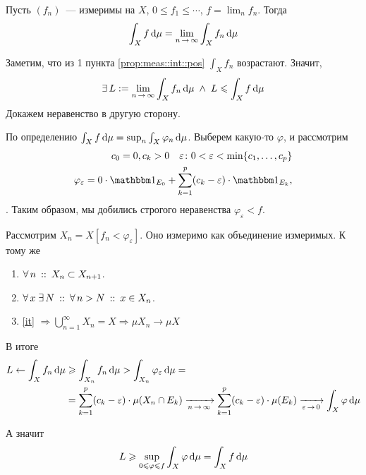 \documentclass[draft, timbord]{longnotes}
\begin{document}
\begin{thrm}\label{thrm:meas::levi}
  Пусть $(f_n)$~--- измеримы на $X$, $0 \leqslant f_1 \leqslant \cdots $, 
  $f = \lim_n f_n$. Тогда 
  \[
    \int_X f \, \del \mu  = \lim_{n\to \infty} \int_X f_n \, \del \mu 
  \]
\end{thrm}
\begin{tproof}
  Заметим, что из 1 пункта \ref{prop:meas::int::pos} $\int_X f_n$ возрастают.
  Значит, 
  \[
    \exists\, L := \lim_{n\to \infty } \int_X f_n \, \del \mu 
    \;\land\;
    L \leqslant \int_X f\, \del \mu 
  \]
  Докажем неравенство в другую сторону. 

  По определению
  $\int_X f \, \mathrm{d} \mu = \sup_n \int_X \varphi_n \, \mathrm{d} \mu$.
  Выберем какую-то $\varphi$, и рассмотрим 
  \[
    \begin{split}
      c_0 = 0, c_k > 0 \quad
      \varepsilon \colon 0 < \varepsilon < \min \{c_1, \dotsc, c_p\}\\
      \varphi_\varepsilon = 0\cdot\ind_{E_0} + \sum_{k=1}^p (c_k- \varepsilon) \cdot \ind_{E_k}, 
    \end{split}
  \]
  . Таким образом, мы добились строгого неравенства
  $\varphi_\varepsilon < f$.

  Рассмотрим $X_n = X [f_n < \varphi_\varepsilon ]$. Оно измеримо как объединение измеримых.
  К тому же 

  \begin{enumerate}
    \item $\forall\, n \:::\: X_n \subset X_{n+1}$. 
    \item\label{it} $\forall\, x \; \exists\, N \:::\: \forall\, n > N \:::\: x \in X_n$.
    \item \ref{it} $\Rightarrow \bigcup_{n=1}^\infty X_n = X \Rightarrow \mu X_n \to \mu X$
  \end{enumerate}

  В итоге
  \[
    \begin{split}
      L \gets \int_X f_n  \, \del \mu &\geqslant \int_{X_n} f_n \, \del \mu 
      > \int_{X_n} \varphi_\varepsilon \, \del \mu = \\
      &= \sum_{k=1}^p (c_k -\varepsilon) \cdot \mu(X_n \cap E_k)  
      \xto{n\to \infty} \sum_{k=1}^p (c_k -\varepsilon) \cdot \mu(E_k) 
      \xto{\varepsilon \to 0} \int_X \varphi \, \del \mu 
    \end{split}
  \]

  А значит
  \[
    L \geqslant \sup_{0 \leqslant \varphi \leqslant f} \int_X \varphi \, \mathrm{d} \mu 
    = \int_X f \, \mathrm{d} \mu 
  \]
\end{tproof}
\end{document}
